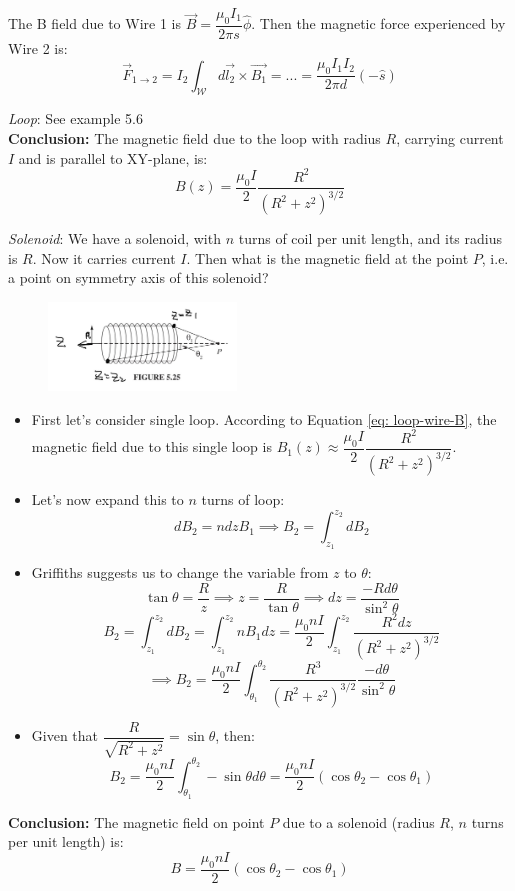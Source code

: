 \documentclass[12pt,a4paper,twoside]{article}
\numberwithin{equation}{section}
\begin{document}
\noindent The B field due to Wire 1 is $\overrightarrow{B}=\dfrac{\mu_0I_1}{2\pi s}\hat{\phi}$. Then the magnetic force experienced by Wire 2 is:
\[\overrightarrow{F}_{1\to 2}=I_2\int_{\mathcal{W}}d\overrightarrow{l_2}\times \overrightarrow{B_1}=...=\frac{\mu_0I_1I_2}{2\pi d}(-\hat{s})\]

\noindent\textit{Loop}: See example 5.6\\
\noindent\textbf{Conclusion:} The magnetic field due to the loop with radius $R$, carrying current $I$ and is parallel to XY-plane, is:
\begin{equation}
    \boxed{
    B(z) = \frac{\mu_0I}{2}\frac{R^2}{(R^2+z^2)^{3/2}}
    }
    \label{eq: loop-wire-B}
\end{equation}

\noindent\textit{Solenoid}: We have a solenoid, with $n$ turns of coil per unit length, and its radius is $R$. Now it carries current $I$. Then what is the magnetic field at the point $P$, i.e. a point on symmetry axis of this solenoid?
\begin{figure}[ht]
    \centering
    \includegraphics[width=5cm]{250-Revision/solenoid-B.jpg}
\end{figure}

\begin{itemize}
    \item First let's consider single loop. According to Equation \ref{eq: loop-wire-B}, the magnetic field due to this single loop is $B_1(z)\approx \dfrac{\mu_0I}{2}\dfrac{R^2}{(R^2+z^2)^{3/2}}$.
    
    \item Let's now expand this to $n$ turns of loop:
    \[dB_2=ndzB_1\implies B_2=\int_{z_1}^{z_2}dB_2\]
    
    \item Griffiths suggests us to change the variable from $z$ to $\theta$:
    \[\tan\theta=\frac{R}{z}\implies z=\frac{R}{\tan\theta}\implies dz=\frac{-Rd\theta}{\sin^2\theta }\]
    \[B_2=\int_{z_1}^{z_2}dB_2=\int_{z_1}^{z_2}nB_1dz=\frac{\mu_0nI}{2}\int_{z_1}^{z_2}\frac{R^2dz}{(R^2+z^2)^{3/2}}\]
    \[\implies B_2=\frac{\mu_0nI}{2}\int_{\theta_1}^{\theta_2}\frac{R^3}{(R^2+z^2)^{3/2}}\frac{-d\theta}{\sin^2\theta}\]
    
    \item Given that $\dfrac{R}{\sqrt{R^2+z^2}}=\sin\theta$, then:
    \[B_2=\frac{\mu_0nI}{2}\int_{\theta_1}^{\theta_2}-\sin\theta d\theta=\frac{\mu_0nI}{2}(\cos\theta_2-\cos\theta_1)\]
    
\end{itemize}
\textbf{Conclusion:} The magnetic field on point $P$ due to a solenoid (radius $R$, $n$ turns per unit length) is:
\begin{equation}
    \boxed{
    B = \frac{\mu_0nI}{2}(\cos\theta_2-\cos\theta_1)
    }
    \label{eq: solenoid-B-finite}
\end{equation}
\end{document}
